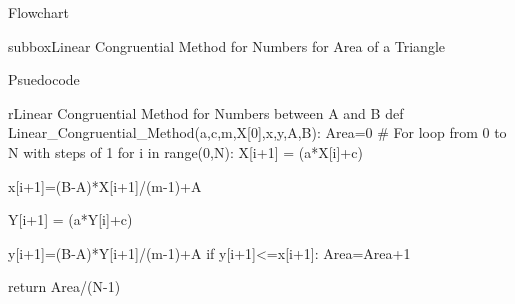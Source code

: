 \documentclass[10pt,a4paper]{article}
\begin{document}
\begin{textbox}{Flowchart }
\begin{subbox}{subbox}{Linear Congruential Method for  Numbers for Area of a Triangle}
\begin{center}
\begin{tikzpicture}[auto]
\end{tikzpicture}

\end{center}
\end{subbox}

\end{textbox}


\begin{textbox}{Psuedocode}
\begin{codebox}{r}{Linear Congruential Method for  Numbers between A and B }
def Linear_Congruential_Method(a,c,m,X[0],x,y,A,B): 
Area=0
# For loop from 0 to N with steps of 1
    for i in range(0,N):
        X[i+1] = (a*X[i]+c) %
        
        x[i+1]=(B-A)*X[i+1]/(m-1)+A
        
        Y[i+1] = (a*Y[i]+c)%
        
        y[i+1]=(B-A)*Y[i+1]/(m-1)+A
        if y[i+1]<=x[i+1]:
            Area=Area+1
            
    return Area/(N-1)


\end{codebox}
\end{textbox}
\end{document}
